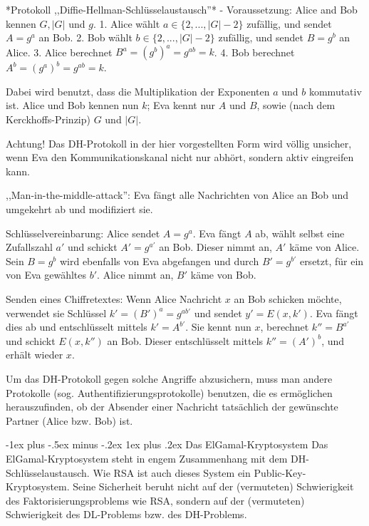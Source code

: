\documentclass[a4paper]{article}
\makeatletter
\renewcommand{\subsubsection}{\@startsection{subsubsection}{3}{0mm}%
 {-1ex plus -.5ex minus -.2ex}%
 {1ex plus .2ex}%
 {\normalfont\small\bfseries}}
\makeatother
\begin{document}
\begin{multicols}{3}
        *Protokoll ,,Diffie-Hellman-Schlüsselaustausch''*
        - Voraussetzung: Alice and Bob kennen $G,|G|$ und $g$.
        1. Alice wählt $a\in\{2 ,...,|G|- 2\}$ zufällig, und sendet $A=g^a$ an Bob.
        2. Bob wählt $b\in\{2 ,...,|G|-2\}$ zufällig, und sendet $B=g^b$ an Alice.
        3. Alice berechnet $B^a= (g^b)^a=g^{ab}=k$.
        4. Bob berechnet $A^b= (g^a)^b=g^{ab}=k$.

        Dabei wird benutzt, dass die Multiplikation der Exponenten $a$ und $b$ kommutativ ist. Alice und Bob kennen nun $k$; Eva kennt nur $A$ und $B$, sowie (nach dem Kerckhoffs-Prinzip) $G$ und $|G|$.

        Achtung! Das DH-Protokoll in der hier vorgestellten Form wird völlig unsicher, wenn Eva den Kommunikationskanal nicht nur abhört, sondern aktiv eingreifen kann.

        ,,Man-in-the-middle-attack'': Eva fängt alle Nachrichten von Alice an Bob und umgekehrt ab und modifiziert sie.

        Schlüsselvereinbarung: Alice sendet $A=g^a$. Eva fängt $A$ ab, wählt selbst eine Zufallszahl $a'$ und schickt $A'=g^{a'}$ an Bob. Dieser nimmt an, $A'$ käme von Alice. Sein $B=g^b$ wird ebenfalls von Eva abgefangen und durch $B'=g^{b'}$ ersetzt, für ein von Eva gewähltes $b'$. Alice nimmt an, $B'$ käme von Bob.

        Senden eines Chiffretextes: Wenn Alice Nachricht $x$ an Bob schicken möchte, verwendet sie Schlüssel $k'= (B')^a=g^{ab'}$ und sendet $y'=E(x,k')$. Eva fängt dies ab und entschlüsselt mittels $k'=A^{b'}$. Sie kennt nun $x$, berechnet $k''=B^{a'}$ und schickt $E(x,k'')$ an Bob. Dieser entschlüsselt mittels $k''= (A')^b$, und erhält wieder $x$.

        Um das DH-Protokoll gegen solche Angriffe abzusichern, muss man andere Protokolle (sog. Authentifizierungsprotokolle) benutzen, die es ermöglichen herauszufinden, ob der Absender einer Nachricht tatsächlich der gewünschte Partner (Alice bzw. Bob) ist.

        \subsubsection{Das ElGamal-Kryptosystem}
        Das ElGamal-Kryptosystem steht in engem Zusammenhang mit dem DH-Schlüsselaustausch. Wie RSA ist auch dieses System ein Public-Key-Kryptosystem. Seine Sicherheit beruht nicht auf der (vermuteten) Schwierigkeit des Faktorisierungsproblems wie RSA, sondern auf der (vermuteten) Schwierigkeit des DL-Problems bzw. des DH-Problems.


\end{multicols}
\end{document}
